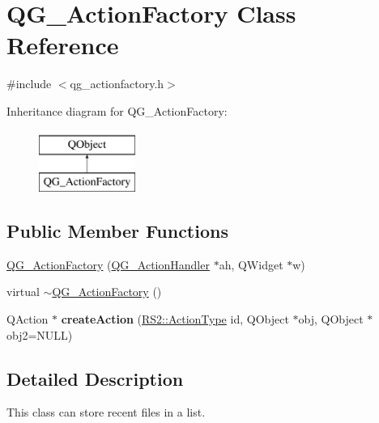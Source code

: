 \hypertarget{classQG__ActionFactory}{\section{Q\-G\-\_\-\-Action\-Factory Class Reference}
\label{classQG__ActionFactory}
}


{\ttfamily \#include $<$qg\-\_\-actionfactory.\-h$>$}

Inheritance diagram for Q\-G\-\_\-\-Action\-Factory\-:\begin{figure}[H]
\begin{center}
\leavevmode
\includegraphics[height=2.000000cm]{classQG__ActionFactory}
\end{center}
\end{figure}
\subsection*{Public Member Functions}
\begin{DoxyCompactItemize}
\item 
\hyperlink{classQG__ActionFactory_a78b83a92d97f127a563df4baa76a3c13}{Q\-G\-\_\-\-Action\-Factory} (\hyperlink{classQG__ActionHandler}{Q\-G\-\_\-\-Action\-Handler} $\ast$ah, Q\-Widget $\ast$w)
\item 
virtual \hyperlink{classQG__ActionFactory_a62a3a20051584467868bafd6af475f73}{$\sim$\-Q\-G\-\_\-\-Action\-Factory} ()
\item 
\hypertarget{classQG__ActionFactory_af1cb81ffbd071d6e5287194a2d0de357}{Q\-Action $\ast$ {\bfseries create\-Action} (\hyperlink{classRS2_afe3523e0bc41fd637b892321cfc4b9d7}{R\-S2\-::\-Action\-Type} id, Q\-Object $\ast$obj, Q\-Object $\ast$obj2=N\-U\-L\-L)}\label{classQG__ActionFactory_af1cb81ffbd071d6e5287194a2d0de357}

\end{DoxyCompactItemize}


\subsection{Detailed Description}
This class can store recent files in a list. 

